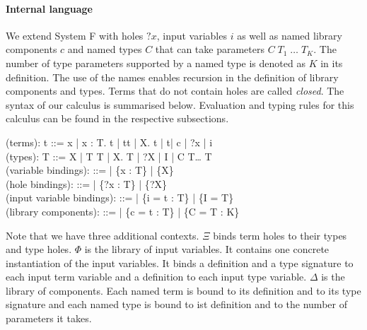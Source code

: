 \paragraph{Internal language} We extend System F with holes $?x$, input variables $i$ as well as named library components $c$ and named types $C$ that can take parameters $C\; T_1\;\ldots\; T_K$. The number of type parameters supported by a named type is denoted as $K$ in its definition. The use of the names enables recursion in the definition of library components and types. Terms that do not contain holes are called \emph{closed}.
The syntax of our calculus is summarised below. Evaluation and typing rules for this calculus can be found in the respective subsections.

 \begin{plstx}
(terms): t ::= x | \lambda x : T.\; t | t\;t | \Lambda X.\; t | t\;[T] | c | {?x} | i\\
(types): T ::= X | T \rightarrow T | \forall X.\; T | ?X | I | C\; T\;\ldots\; T\\
(variable bindings): \Gamma ::= \emptyset | \Gamma \cup \{x : T\} | \Gamma \cup \{X\}\\
(hole bindings): \Xi ::= \emptyset | \Xi \cup \{{?x} : T\} | \Xi \cup \{{?X}\}\\
(input variable bindings): \Phi ::= \emptyset | \Phi \cup \{i = t : T\} | \Phi \cup \{I = T\}\\
(library components): \Delta ::= \emptyset | \Delta \cup \{c = t : T\} | \Delta \cup \{C = T : K\}\\
\end{plstx}
Note that we have three additional contexts. $\Xi$ binds term holes to their types and type holes.
$\Phi$ is the library of input variables. It contains one concrete instantiation of the input variables. It binds a definition and a type signature to each input term variable and a definition to each input type variable.
$\Delta$ is the library of components. Each named term is bound to its definition and to its type signature and each named type is bound to ist definition and to the number of parameters it takes.


